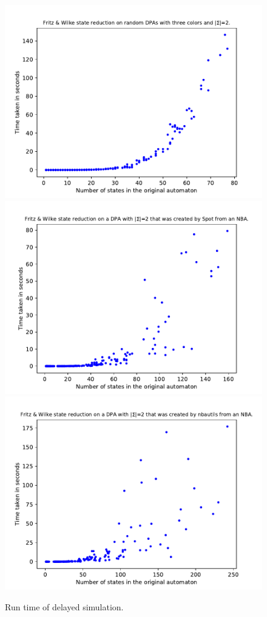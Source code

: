 \begin{figure}
	\centering
	\includegraphics[page=1,height=.3\textheight]{../data/analysis/fritzwilke/gendet_ap1.pdf} 
	\includegraphics[page=1,height=.3\textheight]{../data/analysis/fritzwilke/detspot_ap1.pdf} 
	\includegraphics[page=1,height=.3\textheight]{../data/analysis/fritzwilke/detnbaut_ap1.pdf} 
	\caption{Run time of delayed simulation.}
	\label{exp:fig:fritzwilke_time}
\end{figure}